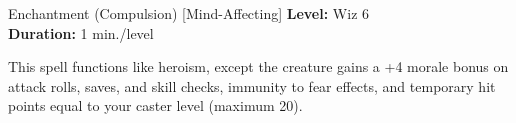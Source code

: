 {Enchantment (Compulsion) [Mind-Affecting]}
{
	\textbf{Level:}
	Wiz 6\\
	\textbf{Duration:}
	1 min./level\\
}
{
	This spell functions like heroism, except the creature gains a +4 morale bonus on attack rolls, saves, and skill checks, immunity to fear effects, and temporary hit points equal to your caster level (maximum 20).

}
